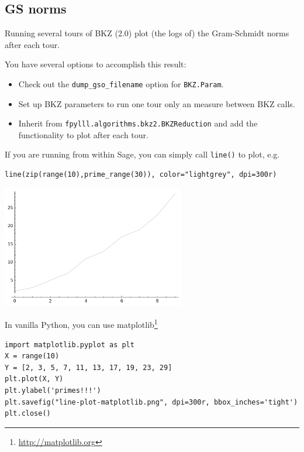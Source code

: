 \documentclass[10pt,a4paper]{tufte-handout}
\begin{document}
\subsection{GS norms}
\label{sec:orgc9e1994}

Running several tours of BKZ (2.0) plot (the logs of) the Gram-Schmidt norms after each tour.

You have several options to accomplish this result:

\begin{itemize}
\item Check out the \texttt{dump\_gso\_filename} option for \texttt{BKZ.Param}.

\item Set up BKZ parameters to run one tour only an measure between BKZ calls.

\item Inherit from \texttt{fpylll.algorithms.bkz2.BKZReduction} and add the functionality to plot after each tour.
\end{itemize}

If you are running from within Sage, you can simply call \texttt{line()} to plot, e.g. 

\lstset{language=sage,label= ,caption= ,captionpos=b,numbers=none}
\begin{lstlisting}
line(zip(range(10),prime_range(30)), color="lightgrey", dpi=300r)
\end{lstlisting}


\begin{center}
\includegraphics[width=0.6\textwidth]{line-plot-sage.png}
\end{center}

In vanilla Python, you can use matplotlib\footnote{\url{http://matplotlib.org}}

\lstset{language=sage,label= ,caption= ,captionpos=b,numbers=none}
\begin{lstlisting}
import matplotlib.pyplot as plt
X = range(10)
Y = [2, 3, 5, 7, 11, 13, 17, 19, 23, 29]
plt.plot(X, Y)
plt.ylabel('primes!!!')
plt.savefig("line-plot-matplotlib.png", dpi=300r, bbox_inches='tight')
plt.close()
\end{lstlisting}
\end{document}
